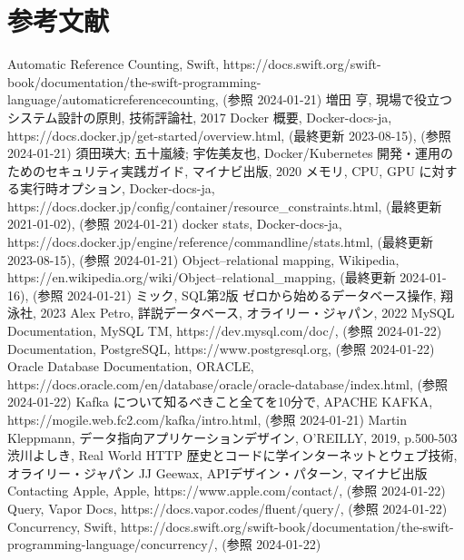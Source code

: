 \documentclass[../../main]{subfiles}
\begin{document}
    \section{参考文献}\label{sec:reference}

    \begin{thebibliography}{99}
         Automatic Reference Counting, Swift, https://docs.swift.org/swift-book/documentation/the-swift-programming-language/automaticreferencecounting, (参照 2024-01-21)
         増田 亨, 現場で役立つシステム設計の原則, 技術評論社, 2017
         Docker 概要, Docker-docs-ja, https://docs.docker.jp/get-started/overview.html, (最終更新 2023-08-15), (参照 2024-01-21)
         須田瑛大; 五十嵐綾; 宇佐美友也, Docker/Kubernetes 開発・運用のためのセキュリティ実践ガイド, マイナビ出版, 2020
         メモリ, CPU, GPU に対する実行時オプション, Docker-docs-ja, https://docs.docker.jp/config/container/resource\_constraints.html, (最終更新 2021-01-02), (参照 2024-01-21)
         docker stats, Docker-docs-ja, https://docs.docker.jp/engine/reference/commandline/stats.html, (最終更新 2023-08-15), (参照 2024-01-21)
         Object–relational mapping, Wikipedia, https://en.wikipedia.org/wiki/Object–relational\_mapping, (最終更新 2024-01-16), (参照 2024-01-21)
         ミック, SQL第2版 ゼロから始めるデータベース操作, 翔泳社, 2023
         Alex Petro, 詳説データベース, オライリー・ジャパン, 2022
         MySQL Documentation, MySQL TM, https://dev.mysql.com/doc/, (参照 2024-01-22)
         Documentation, PostgreSQL, https://www.postgresql.org, (参照 2024-01-22)
         Oracle Database Documentation, ORACLE, https://docs.oracle.com/en/database/oracle/oracle-database/index.html, (参照 2024-01-22)
         Kafka について知るべきこと全てを10分で, APACHE KAFKA, https://mogile.web.fc2.com/kafka/intro.html, (参照 2024-01-21)
         Martin Kleppmann, データ指向アプリケーションデザイン, O'REILLY, 2019, p.500-503
         渋川よしき, Real World HTTP 歴史とコードに学インターネットとウェブ技術, オライリー・ジャパン
         JJ Geewax, APIデザイン・パターン, マイナビ出版
         Contacting Apple, Apple, https://www.apple.com/contact/, (参照 2024-01-22)
         Query, Vapor Docs, https://docs.vapor.codes/fluent/query/, (参照 2024-01-22)
         Concurrency, Swift, https://docs.swift.org/swift-book/documentation/the-swift-programming-language/concurrency/, (参照 2024-01-22)
    \end{thebibliography}

    \clearpage
\end{document}
